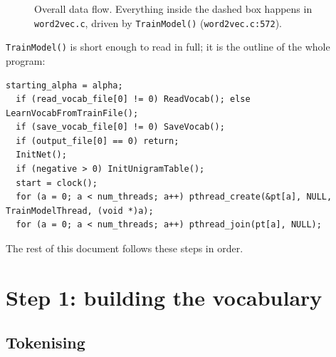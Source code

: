 \documentclass[11pt,a4paper]{article}
\newcommand{\code}[1]{\texttt{#1}}
\newcommand{\src}[1]{\texttt{word2vec.c:#1}}
\begin{document}
\begin{figure}[ht]
\caption{Overall data flow. Everything inside the dashed box happens in \code{word2vec.c},
driven by \code{TrainModel()} (\src{572}).}
\label{fig:pipeline}
\end{figure}

\code{TrainModel()} is short enough to read in full; it is the outline of the whole
program:

\begin{lstlisting}[firstnumber=579]
  starting_alpha = alpha;
  if (read_vocab_file[0] != 0) ReadVocab(); else LearnVocabFromTrainFile();
  if (save_vocab_file[0] != 0) SaveVocab();
  if (output_file[0] == 0) return;
  InitNet();
  if (negative > 0) InitUnigramTable();
  start = clock();
  for (a = 0; a < num_threads; a++) pthread_create(&pt[a], NULL, TrainModelThread, (void *)a);
  for (a = 0; a < num_threads; a++) pthread_join(pt[a], NULL);
\end{lstlisting}

The rest of this document follows these steps in order.

\section{Step 1: building the vocabulary}

\subsection{Tokenising}
\end{document}
